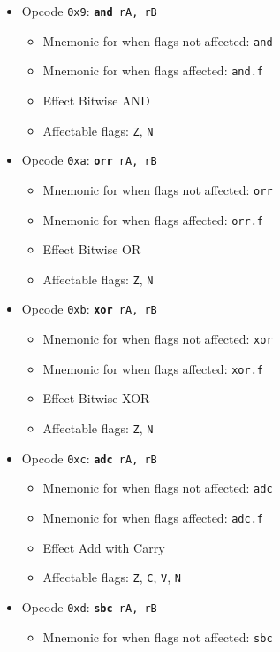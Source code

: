 \documentclass{article}
\begin{document}
\begin{itemize}
	\item Opcode \texttt{0x9}:
		\texttt{\textbf{and} rA, rB}
		\begin{itemize}
		\item Mnemonic for when flags not affected: \texttt{and}
		\item Mnemonic for when flags affected: \texttt{and.f}
		\item Effect Bitwise AND
		\item Affectable flags:
			\texttt{Z}, \texttt{N}
		\end{itemize}
	\item Opcode \texttt{0xa}:
		\texttt{\textbf{orr} rA, rB}
		\begin{itemize}
		\item Mnemonic for when flags not affected: \texttt{orr}
		\item Mnemonic for when flags affected: \texttt{orr.f}
		\item Effect Bitwise OR
		\item Affectable flags:
			\texttt{Z}, \texttt{N}
		\end{itemize}
	\item Opcode \texttt{0xb}:
		\texttt{\textbf{xor} rA, rB}
		\begin{itemize}
		\item Mnemonic for when flags not affected: \texttt{xor}
		\item Mnemonic for when flags affected: \texttt{xor.f}
		\item Effect Bitwise XOR
		\item Affectable flags:
			\texttt{Z}, \texttt{N}
		\end{itemize}
	\item Opcode \texttt{0xc}:
		\texttt{\textbf{adc} rA, rB}
		\begin{itemize}
		\item Mnemonic for when flags not affected: \texttt{adc}
		\item Mnemonic for when flags affected: \texttt{adc.f}
		\item Effect Add with Carry
		\item Affectable flags:
			\texttt{Z}, \texttt{C}, \texttt{V}, \texttt{N}
		\end{itemize}
	\item Opcode \texttt{0xd}:
		\texttt{\textbf{sbc} rA, rB}
		\begin{itemize}
		\item Mnemonic for when flags not affected: \texttt{sbc}

\end{itemize}
\end{itemize}
\end{document}
